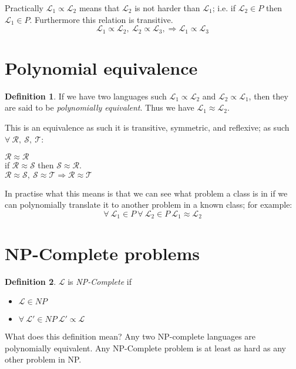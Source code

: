\documentclass{article}
\theoremstyle{definition}
\newtheorem{definition}{Definition}[section]
\begin{document}
Practically $\mathcal{L_1} \propto \mathcal{L_2}$ means that
$\mathcal{L_2}$ is not harder than $\mathcal{L_1}$;
i.e. if $\mathcal{L_2} \in P$ then $\mathcal{L_1} \in P$.
Furthermore this relation is transitive.
$$
  \mathcal{L_1} \propto \mathcal{L_2},\ 
  \mathcal{L_2} \propto \mathcal{L_3},\Rightarrow
  \mathcal{L_1} \propto \mathcal{L_3}
$$

\section{Polynomial equivalence}
\begin{definition}
	If we have two languages such $\mathcal{L_1} \propto \mathcal{L_2}$ and
	$\mathcal{L_2} \propto \mathcal{L_1}$, then they are said to be \textit{polynomially equivalent}.
	Thus we have $\mathcal{L_1} \approx \mathcal{L_2}$.
\end{definition}

This is an equivalence as such it is transitive, symmetric, and reflexive;
as such $\forall\ \mathcal{R},\ \mathcal{S},\ \mathcal{T}$:
\begin{center}
	$\mathcal{R} \approx \mathcal{R}$\\
	if $\mathcal{R} \approx \mathcal{S}$ then $\mathcal{S} \approx \mathcal{R}$.\\
	$
		\mathcal{R} \approx \mathcal{S},\ 
		\mathcal{S} \approx \mathcal{T} \Rightarrow
		\mathcal{R} \approx \mathcal{T}
	$
\end{center}

In practise what this means is that we can see what problem a class is in if we can
polynomially translate it to another problem in a known class; for example:
$$
  \forall\ \mathcal{L_1} \in P\ 
  \forall\ \mathcal{L_2} \in P\ 
  \mathcal{L_1} \approx \mathcal{L_2}
$$

\section{NP-Complete problems}
\begin{definition}
	$\mathcal{L}$ is \textit{NP-Complete} if
	\begin{itemize}
		\item $\mathcal{L} \in NP$
		\item $\forall\ \mathcal{L\prime} \in NP\ \mathcal{L\prime} \propto \mathcal{L}$
	\end{itemize}
\end{definition}

What does this definition mean?
Any two NP-complete languages are polynomially equivalent.
Any NP-Complete problem is at least as hard as any other problem in NP.
\end{document}
